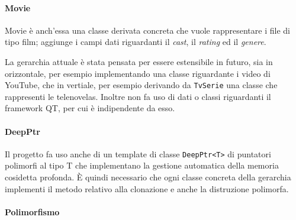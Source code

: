 \paragraph{Movie}
Movie è anch'essa una classe derivata concreta che vuole rappresentare i file di tipo film; aggiunge i campi dati riguardanti il \textit{cast}, il \textit{rating} ed il \textit{genere}. 

La gerarchia attuale è stata pensata per essere estensibile in futuro, sia in orizzontale, per esempio implementando una classe riguardante i video di YouTube, che in vertiale, per esempio derivando da \texttt{TvSerie} una classe che rappresenti le telenovelas. \newline
Inoltre non fa uso di dati o classi riguardanti il framework QT, per cui è indipendente da esso.

\paragraph{DeepPtr}
Il progetto fa uso anche di un template di classe \texttt{DeepPtr<T>} di puntatori polimorfi al tipo T che implementano la gestione automatica della memoria cosidetta profonda. È quindi necessario che ogni classe concreta della gerarchia implementi il metodo relativo alla clonazione e anche la distruzione polimorfa.

\paragraph{Polimorfismo}



